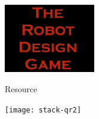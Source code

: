 \documentclass[11pt]{article}
\begin{document}
\color{white}            
    
    \begin{center}
        
        \rule{0pt}{10mm}    


        \includegraphics[trim=5 5 5 5,clip,height=3cm]{rdg_logo}%
        
        \rule{0pt}{5mm}    
        
        

Resource



        \rule{0pt}{5mm}    

        \texttt{[image: stack-qr2]}%

        

    \end{center}
\end{document}

